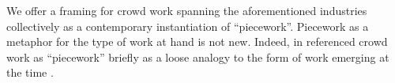 \documentclass[trackingWork]{subfiles}
\begin{document}


We offer a framing for crowd work spanning the aforementioned industries
collectively as a contemporary instantiation of ``piecework''.
Piecework as a metaphor for the type of work at hand is not new.
Indeed,
\citeauthor{crowdworkFuture}
in
\citeauthor{crowdworkFuture}
referenced crowd work as ``piecework'' briefly
as a loose analogy to the form of work emerging at the time
\cite{crowdworkFuture}.

\end{document}
